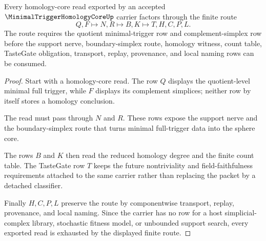 \begin{theorem}
\label{thm:minimal-trigger-homology-core-support-nerve-route}
Every homology-core read exported by an accepted $\MinimalTriggerHomologyCoreUp$ carrier factors through the finite route
$$
Q,F \longmapsto N,R \longmapsto B,K \longmapsto T,H,C,P,L .
$$
The route requires the quotient minimal-trigger row and complement-simplex row before the support nerve, boundary-simplex route, homology witness, count table, TasteGate obligation, transport, replay, provenance, and local naming rows can be consumed.
\end{theorem}
\begin{proof}
Start with a homology-core read. The row $Q$ displays the quotient-level minimal full trigger, while $F$ displays its complement simplices; neither row by itself stores a homology conclusion.

The read must pass through $N$ and $R$. These rows expose the support nerve and the boundary-simplex route that turns minimal full-trigger data into the sphere core.

The rows $B$ and $K$ then read the reduced homology degree and the finite count table. The TasteGate row $T$ keeps the future nontriviality and field-faithfulness requirements attached to the same carrier rather than replacing the packet by a detached classifier.

Finally $H,C,P,L$ preserve the route by componentwise transport, replay, provenance, and local naming. Since the carrier has no row for a host simplicial-complex library, stochastic fitness model, or unbounded support search, every exported read is exhausted by the displayed finite route.
\end{proof}



